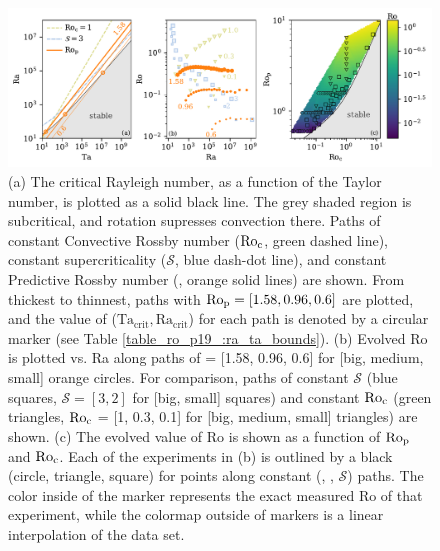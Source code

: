 \begin{figure}[t!]
    \includegraphics[width=\textwidth]{./figs/parameter_space.pdf}
    \caption[Parameter space of rotating convection: critical values and Rossby number dependence on inputs]
	{(a) The critical Rayleigh number, as a function of the Taylor number, 
    is plotted as a solid black line. The grey shaded region is subcritical, and rotation
    supresses convection there. Paths of constant Convective Rossby number
    ($\text{Ro}_{\text{c}}$, green dashed line), constant supercriticality ($\mathcal{S}$, blue dash-dot line), and 
    constant Predictive Rossby number (\pro, orange solid lines) are shown. 
	From thickest to thinnest, paths with $\text{Ro}_{\text{p}} = [1.58, 0.96, 0.6]$ are plotted,
	and the value of
	($\text{Ta}_{\text{crit}}, \text{Ra}_{\text{crit}}$) for each path is denoted by a
	circular marker (see Table \ref{table_ro_p19_:ra_ta_bounds}).
    (b) Evolved Ro is plotted vs. Ra along paths of \pro = [1.58, 0.96, 0.6] for [big, medium, small] orange circles.
    For comparison, paths of constant $\mathcal{S}$ (blue squares, $\mathcal{S} = [3,2]$ 
    for [big, small] squares)
    and constant $\text{Ro}_{\text{c}}$ (green triangles, $\text{Ro}_{\text{c}}$ = [1, 0.3, 0.1] for [big, medium, small] triangles) are shown.
    (c) The evolved value of Ro is shown as a function of $\text{Ro}_{\text{p}}$ and $\text{Ro}_{\text{c}}$. 
	Each of the experiments in (b) is outlined by a black (circle, triangle, square)
	for points along constant (\pro, \con, $\mathcal{S}$) paths.
	The color inside of the marker represents the exact measured Ro of that experiment, 
	while the colormap outside of markers is a linear interpolation
	of the data set. 
    \label{fig:parameter_space} }
\end{figure}


